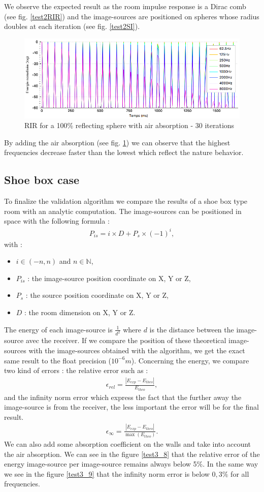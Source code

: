 \documentclass[AMA,STIX1COL]{WileyNJD-v2}
\begin{document}
%
We observe the expected result as the room impulse response is a Dirac comb (see fig. \ref{test2RIR}) and the image-sources are positioned on spheres whose radius doubles at each iteration (see fig. \ref{test2SI}).
%
\begin{figure}[h]
\centering
	\includegraphics[width=0.6\linewidth]{test2absair}
	\caption{RIR for a 100\% reflecting sphere with air absorption - 30 iterations}
	\label{test2absair}
\end{figure}
%
By adding the air absorption (see fig. \ref{test2absair}) we can observe that the highest frequencies decrease faster than the lowest which reflect the nature behavior.

\subsection{Shoe box case}
To finalize the validation algorithm we compare the results of a shoe box type room with an analytic computation. The image-sources can be positioned in space with the following formula \cite{mcgovern} :
\begin{align}
P_{is} = i \times D + P_s \times (-1)^i,
\end{align}
with : 
\begin{itemize}
\item$i \in (-n, n)$ and $n \in \mathbb{N}$,
\item$P_{is}$ : the image-source position coordinate on X, Y or Z,
\item$P_s$ : the source position coordinate on X, Y or Z,
\item$D$ : the room dimension on X, Y or Z.
\end{itemize}
The energy of each image-source is $\frac{1}{d^2}$ where $d$ is the distance between the image-source avec the receiver. If we compare the position of these theoretical image-sources with the image-sources obtained with the algorithm, we get the exact same result to the float precision ($10^{-6}m$). Concerning the energy, we compare two kind of errors : the relative error such as :
\begin{align}
\epsilon_{rel} = \frac{|E_{exp}-E_{theo}|}{E_{theo}},
\end{align}
and the infinity norm error which express the fact that the further away the image-source is from the receiver, the less important the error will be for the final result.
\begin{align}
\epsilon_{\infty} = \frac{|E_{exp}-E_{theo}|}{\max(E_{theo})}.
\end{align}
We can also add some absorption coefficient on the walls and take into account the air absorption. We can see in the figure \ref{test3_8} that the relative error of the energy image-source per image-source remains always below 5\%. In the same way we see in the figure \ref{test3_9} that the infinity norm error is below $0,3\%$ for all frequencies.
\end{document}
